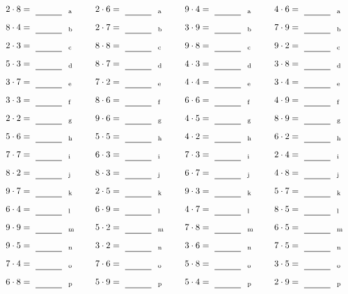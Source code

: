\documentclass
[
  draft    = true,
  fontsize = 11pt,
  parskip  = half-
]
{scrartcl}
\begin{document}
\par\vfill\par
\begin{align*}
    \pline{2\cdot8}&=\rline{a}
  & \pline{2\cdot6}&=\rline{a}
  & \pline{9\cdot4}&=\rline{a}
  & \pline{4\cdot6}&=\rline{a} \\[1ex]
    \pline{8\cdot4}&=\rline{b}
  & \pline{2\cdot7}&=\rline{b}
  & \pline{3\cdot9}&=\rline{b}
  & \pline{7\cdot9}&=\rline{b} \\[1ex]
    \pline{2\cdot3}&=\rline{c}
  & \pline{8\cdot8}&=\rline{c}
  & \pline{9\cdot8}&=\rline{c}
  & \pline{9\cdot2}&=\rline{c} \\[1ex]
    \pline{5\cdot3}&=\rline{d}
  & \pline{8\cdot7}&=\rline{d}
  & \pline{4\cdot3}&=\rline{d}
  & \pline{3\cdot8}&=\rline{d} \\[1ex]
    \pline{3\cdot7}&=\rline{e}
  & \pline{7\cdot2}&=\rline{e}
  & \pline{4\cdot4}&=\rline{e}
  & \pline{3\cdot4}&=\rline{e} \\[1ex]
    \pline{3\cdot3}&=\rline{f}
  & \pline{8\cdot6}&=\rline{f}
  & \pline{6\cdot6}&=\rline{f}
  & \pline{4\cdot9}&=\rline{f} \\[1ex]
    \pline{2\cdot2}&=\rline{g}
  & \pline{9\cdot6}&=\rline{g}
  & \pline{4\cdot5}&=\rline{g}
  & \pline{8\cdot9}&=\rline{g} \\[1ex]
    \pline{5\cdot6}&=\rline{h}
  & \pline{5\cdot5}&=\rline{h}
  & \pline{4\cdot2}&=\rline{h}
  & \pline{6\cdot2}&=\rline{h} \\[1ex]
    \pline{7\cdot7}&=\rline{i}
  & \pline{6\cdot3}&=\rline{i}
  & \pline{7\cdot3}&=\rline{i}
  & \pline{2\cdot4}&=\rline{i} \\[1ex]
    \pline{8\cdot2}&=\rline{j}
  & \pline{8\cdot3}&=\rline{j}
  & \pline{6\cdot7}&=\rline{j}
  & \pline{4\cdot8}&=\rline{j} \\[1ex]
    \pline{9\cdot7}&=\rline{k}
  & \pline{2\cdot5}&=\rline{k}
  & \pline{9\cdot3}&=\rline{k}
  & \pline{5\cdot7}&=\rline{k} \\[1ex]
    \pline{6\cdot4}&=\rline{l}
  & \pline{6\cdot9}&=\rline{l}
  & \pline{4\cdot7}&=\rline{l}
  & \pline{8\cdot5}&=\rline{l} \\[1ex]
    \pline{9\cdot9}&=\rline{m}
  & \pline{5\cdot2}&=\rline{m}
  & \pline{7\cdot8}&=\rline{m}
  & \pline{6\cdot5}&=\rline{m} \\[1ex]
    \pline{9\cdot5}&=\rline{n}
  & \pline{3\cdot2}&=\rline{n}
  & \pline{3\cdot6}&=\rline{n}
  & \pline{7\cdot5}&=\rline{n} \\[1ex]
    \pline{7\cdot4}&=\rline{o}
  & \pline{7\cdot6}&=\rline{o}
  & \pline{5\cdot8}&=\rline{o}
  & \pline{3\cdot5}&=\rline{o} \\[1ex]
    \pline{6\cdot8}&=\rline{p}
  & \pline{5\cdot9}&=\rline{p}
  & \pline{5\cdot4}&=\rline{p}
  & \pline{2\cdot9}&=\rline{p}
\end{align*}
\end{document}

